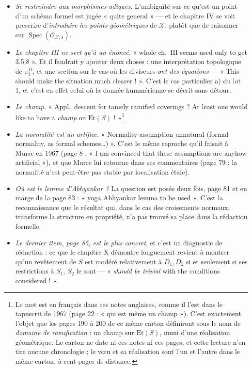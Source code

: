 \documentclass[11pt,a4paper]{article}
\begin{document}
\begin{itemize}
  \item \emph{Se restreindre aux morphismes adiques.} L'ambiguïté sur ce qu'est
    un point d'un schéma formel est jugée « quite general » --- et le chapitre
    IV se voit prescrire d'\emph{introduire les points géométriques} de
    $\mathcal{X}$, plutôt que de raisonner sur
    $\operatorname{Spec}(\mathcal{O}_{\mathcal{X},s})$.
  \item \emph{Le chapitre III ne sert qu'à un énoncé.} « whole ch.\ III seems
    used only to get 3.5.8 ». Et il faudrait y ajouter deux choses : une
    interprétation topologique de $\pi_{1}^{D}$, et une section sur le cas où
    les diviseurs \emph{ont des équations} --- « This should make the situation
    much clearer ! ». C'est le cas particulier a) du lot 1, et c'est en effet
    celui où la donnée kummérienne se décrit sans détour.
  \item \emph{Le champ.} « Appl.\ descent for tamely ramified coverings ? At
    least one would like to have a \emph{champ} on
    $\mathrm{Et}(S)$ ! »\footnote{Le mot est en français dans ces notes
    anglaises, comme il l'est dans le tapuscrit de 1967 (page 22 : « qui est
    même un champ »). C'est exactement l'objet que les pages 190 à 200 de ce
    même carton définiront sous le nom de \emph{domaine de ramification} : un
    champ sur $\mathrm{Et}(S)$, muni d'une réalisation géométrique. Le carton
    ne date ni ces notes ni ces pages, et cette lecture n'en tire aucune
    chronologie ; le vœu et sa réalisation sont l'un et l'autre dans le même
    carton, à cent pages de distance.}
  \item \emph{La normalité est un artifice.} « Normality-assumption unnatural
    (formal normality, as formal schemes\dots) ». C'est le même reproche qu'il
    faisait à Murre en 1967 (page 8 : « I am convinced that these assumptions
    are anyhow artificial »), et que Murre lui retourne dans ses commentaires
    (page 79 : la normalité n'est peut-être pas stable par localisation étale).
  \item \emph{Où est le lemme d'Abhyankar ?} La question est posée deux fois,
    page 81 et en marge de la page 83 : « yoga Abhyankar lemma to be used ».
    C'est la reconnaissance que le résultat qui, dans le cas des croisements
    normaux, transforme la structure en propriété, n'a pas trouvé sa place dans
    la rédaction formelle.
  \item \emph{Le dernier item, page 85, est le plus concret}, et c'est un
    diagnostic de rédaction : ce que le chapitre X démontre longuement revient
    à montrer qu'un revêtement de $S$ est modéré relativement à $D_{1}, D_{2}$
    si et seulement si ses restrictions à $S_{1}$, $S_{2}$ le sont ---
    « \emph{should be trivial} with the conditions considered ! ».
\end{itemize}
\end{document}
